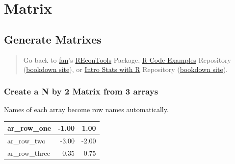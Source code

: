 \documentclass[
]{book}
\newenvironment{Shaded}{\begin{snugshade}}{\end{snugshade}}
\newcommand{\DecValTok}[1]{\textcolor[rgb]{0.00,0.00,0.81}{#1}}
\newcommand{\FloatTok}[1]{\textcolor[rgb]{0.00,0.00,0.81}{#1}}
\newcommand{\KeywordTok}[1]{\textcolor[rgb]{0.13,0.29,0.53}{\textbf{#1}}}
\newcommand{\NormalTok}[1]{#1}
\newcommand{\OperatorTok}[1]{\textcolor[rgb]{0.81,0.36,0.00}{\textbf{#1}}}
\newcommand{\StringTok}[1]{\textcolor[rgb]{0.31,0.60,0.02}{#1}}
\begin{document}
\hypertarget{matrix}{%
\section{Matrix}\label{matrix}}

\hypertarget{generate-matrixes}{%
\subsection{Generate Matrixes}\label{generate-matrixes}}

\begin{quote}
Go back to \href{http://fanwangecon.github.io/}{fan}'s \href{https://fanwangecon.github.io/REconTools/}{REconTools} Package, \href{https://fanwangecon.github.io/R4Econ/}{R Code Examples} Repository (\href{https://fanwangecon.github.io/R4Econ/bookdown}{bookdown site}), or \href{https://fanwangecon.github.io/Stat4Econ/}{Intro Stats with R} Repository (\href{https://fanwangecon.github.io/Stat4Econ/bookdown}{bookdown site}).
\end{quote}

\hypertarget{create-a-n-by-2-matrix-from-3-arrays}{%
\subsubsection{Create a N by 2 Matrix from 3 arrays}\label{create-a-n-by-2-matrix-from-3-arrays}}

Names of each array become row names automatically.

\begin{Shaded}
\end{Shaded}

\begin{table}[!h]
\centering
\begin{tabular}{l|r|r}
\hline
ar\_row\_one & -1.00 & 1.00\\
\hline
\rowcolor{gray!6}  ar\_row\_two & -3.00 & -2.00\\
\hline
ar\_row\_three & 0.35 & 0.75\\
\hline
\end{tabular}
\end{table}
\end{document}
